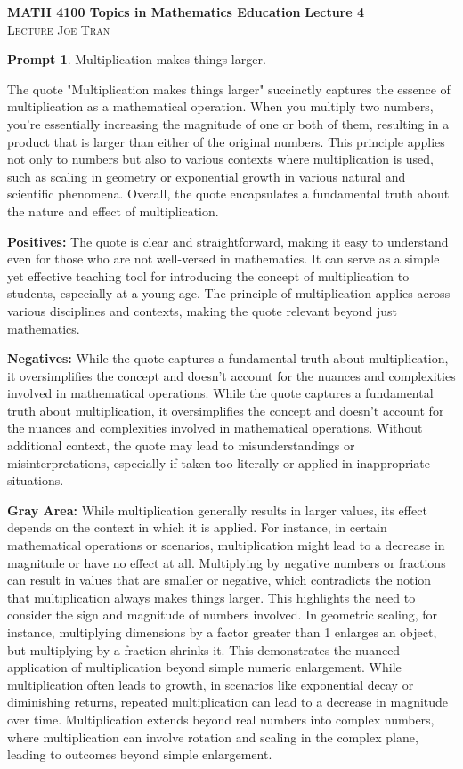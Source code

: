 \documentclass[11pt]{article}
\theoremstyle{definition}\newtheorem{definition}{Definition}
\theoremstyle{definition}\newtheorem{question}{Question}
\theoremstyle{definition}\newtheorem*{solution}{Solution}
\theoremstyle{definition}\newtheorem{example}{Example}
\theoremstyle{definition}\newtheorem{notation}{Notation}
\theoremstyle{theorem}\newtheorem{theorem}{Theorem}
\theoremstyle{theorem}\newtheorem{corollary}{Corollary}
\theoremstyle{theorem}\newtheorem{lemma}{Lemma}
\theoremstyle{theorem}\newtheorem{proposition}{Proposition}
\theoremstyle{theorem}\newtheorem{prompt}{Prompt}
\begin{document}
\noindent \textbf{MATH 4100 Topics in Mathematics Education} \hfill \textbf{Lecture 4} \\
\textsc{Lecture} \hfill \textsc{Joe Tran}

\begin{prompt}
    Multiplication makes things larger.
\end{prompt}

\color{teal}

The quote "Multiplication makes things larger" succinctly captures the essence of multiplication as a mathematical operation. When you multiply two numbers, you're essentially increasing the magnitude of one or both of them, resulting in a product that is larger than either of the original numbers. This principle applies not only to numbers but also to various contexts where multiplication is used, such as scaling in geometry or exponential growth in various natural and scientific phenomena. Overall, the quote encapsulates a fundamental truth about the nature and effect of multiplication.

\textbf{Positives:} The quote is clear and straightforward, making it easy to understand even for those who are not well-versed in mathematics. It can serve as a simple yet effective teaching tool for introducing the concept of multiplication to students, especially at a young age. The principle of multiplication applies across various disciplines and contexts, making the quote relevant beyond just mathematics.

\textbf{Negatives:} While the quote captures a fundamental truth about multiplication, it oversimplifies the concept and doesn't account for the nuances and complexities involved in mathematical operations. While the quote captures a fundamental truth about multiplication, it oversimplifies the concept and doesn't account for the nuances and complexities involved in mathematical operations. Without additional context, the quote may lead to misunderstandings or misinterpretations, especially if taken too literally or applied in inappropriate situations.

\textbf{Gray Area:} While multiplication generally results in larger values, its effect depends on the context in which it is applied. For instance, in certain mathematical operations or scenarios, multiplication might lead to a decrease in magnitude or have no effect at all. Multiplying by negative numbers or fractions can result in values that are smaller or negative, which contradicts the notion that multiplication always makes things larger. This highlights the need to consider the sign and magnitude of numbers involved. In geometric scaling, for instance, multiplying dimensions by a factor greater than 1 enlarges an object, but multiplying by a fraction shrinks it. This demonstrates the nuanced application of multiplication beyond simple numeric enlargement. While multiplication often leads to growth, in scenarios like exponential decay or diminishing returns, repeated multiplication can lead to a decrease in magnitude over time. Multiplication extends beyond real numbers into complex numbers, where multiplication can involve rotation and scaling in the complex plane, leading to outcomes beyond simple enlargement.
\end{document}
